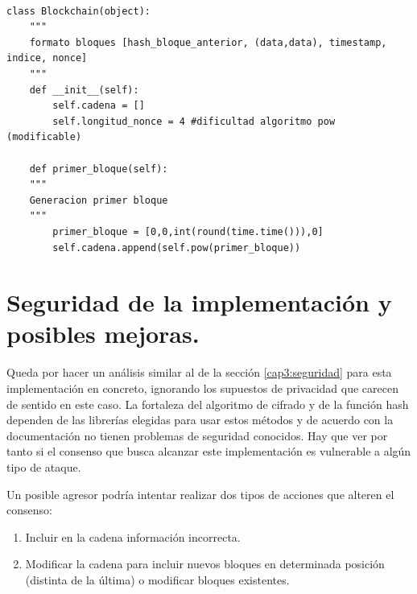 \lstset{language=Python}
\lstset{frame=lines}
\lstset{basicstyle=\footnotesize}
\begin{lstlisting}[title=Clase Blockchain]

class Blockchain(object): 
	"""
	formato bloques [hash_bloque_anterior, (data,data), timestamp, indice, nonce]
	"""
	def __init__(self):
		self.cadena = []
		self.longitud_nonce = 4 #dificultad algoritmo pow (modificable)

	def primer_bloque(self):
	"""
	Generacion primer bloque
	"""
		primer_bloque = [0,0,int(round(time.time())),0]
		self.cadena.append(self.pow(primer_bloque))
\end{lstlisting}



\section{Seguridad de la implementación y posibles mejoras.}
Queda por hacer un análisis similar al de la sección \ref{cap3:seguridad} para esta implementación en concreto, ignorando los supuestos de privacidad que carecen de sentido en este caso. La fortaleza del algoritmo de cifrado y de la función hash dependen de las librerías elegidas para usar estos métodos y de acuerdo con la documentación no tienen problemas de seguridad conocidos.
Hay que ver por tanto si el consenso que busca alcanzar este implementación es vulnerable a algún tipo de ataque. 


Un posible agresor podría intentar realizar dos tipos de acciones que alteren el consenso:

\begin{enumerate}
\item Incluir en la cadena información incorrecta.  
\item Modificar la cadena para incluir nuevos bloques en determinada posición (distinta de la última) o modificar bloques existentes.
\end{enumerate}

